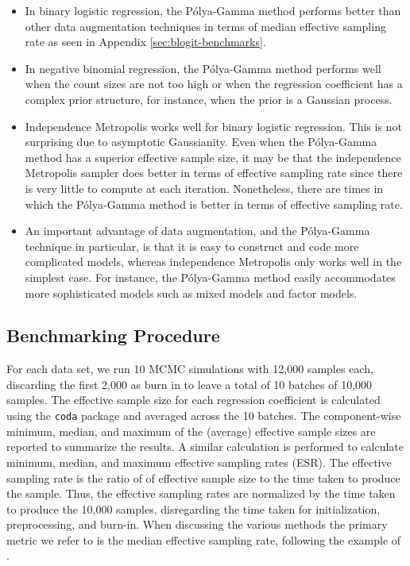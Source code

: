 \documentclass[11pt]{article}
\newcommand{\Polya}{P\'{o}lya}
\begin{document}
\begin{itemize}

\item In binary logistic regression, the \Polya-Gamma method performs better
  than other data augmentation techniques in terms of median effective sampling
  rate as seen in Appendix \ref{sec:blogit-benchmarks}.

\item In negative binomial regression, the \Polya-Gamma method performs well
  when the count sizes are not too high or when the regression coefficient has a
  complex prior structure, for instance, when the prior is a Gaussian process.

\item Independence Metropolis works well for binary logistic regression.  This
  is not surprising due to asymptotic Gaussianity.  Even when the \Polya-Gamma
  method has a superior effective sample size, it may be that the independence
  Metropolis sampler does better in terms of effective sampling rate since there
  is very little to compute at each iteration.  Nonetheless, there are times in
  which the \Polya-Gamma method is better in terms of effective sampling rate.

\item An important advantage of data augmentation, and the \Polya-Gamma
  technique in particular, is that it is easy to construct and code more
  complicated models, whereas independence Metropolis only works well in the
  simplest case.  For instance, the \Polya-Gamma method easily accommodates more
  sophisticated models such as mixed models and factor models.

\end{itemize}

\subsection{Benchmarking Procedure}

For each data set, we run 10 MCMC simulations with 12,000 samples each,
discarding the first 2,000 as burn in to leave a total of 10 batches of 10,000
samples.  The effective sample size for each regression coefficient is
calculated using the \texttt{coda} package and averaged across the 10 batches.
The component-wise minimum, median, and maximum of the (average) effective
sample sizes are reported to summarize the results.  A similar calculation is
performed to calculate minimum, median, and maximum effective sampling rates
(ESR).  The effective sampling rate is the ratio of of effective sample size to
the time taken to produce the sample.  Thus, the effective sampling rates are
normalized by the time taken to produce the 10,000 samples, disregarding the
time taken for initialization, preprocessing, and burn-in.  When discussing the
various methods the primary metric we refer to is the median effective sampling
rate, following the example of \cite{fruhwirth-schnatter-fruhwirth-2010}.
\end{document}
